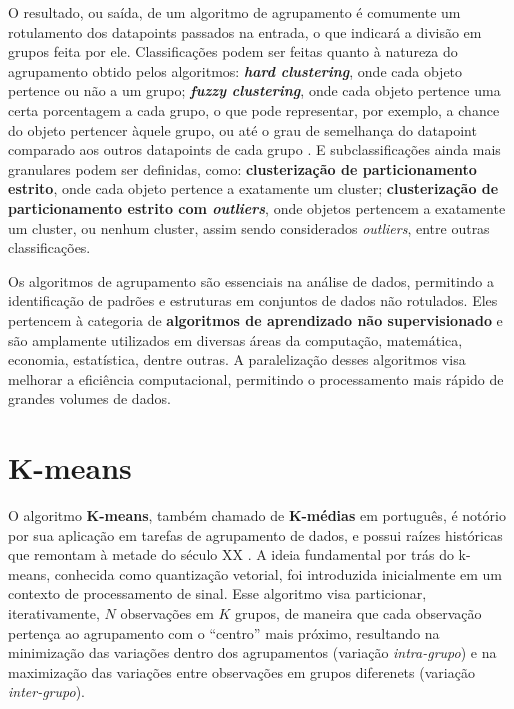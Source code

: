 \documentclass[12pt,
openright, 
oneside, %
a4paper,    %
brazil]{facom-ufu-abntex2}
\begin{document}
O resultado, ou saída, de um algoritmo de agrupamento é comumente um rotulamento dos datapoints passados na entrada, o que indicará a divisão em grupos feita por ele. Classificações podem ser feitas quanto à natureza do agrupamento obtido pelos algoritmos: \textbf{\textit{hard clustering}}, onde cada objeto pertence ou não a um grupo; \textbf{\textit{fuzzy clustering}}, onde cada objeto pertence uma certa porcentagem a cada grupo, o que pode representar, por exemplo, a chance do objeto pertencer àquele grupo, ou até o grau de semelhança do datapoint comparado aos outros datapoints de cada grupo \cite{FuzzyClusteringSurvey}. E subclassificações ainda mais granulares podem ser definidas, como: \textbf{clusterização de particionamento estrito}, onde cada objeto pertence a exatamente um cluster; \textbf{clusterização de particionamento estrito com \textit{outliers}}, onde objetos pertencem a exatamente um cluster, ou nenhum cluster, assim sendo considerados \textit{outliers}, entre outras classificações.

Os algoritmos de agrupamento são essenciais na análise de dados, permitindo a identificação de padrões e estruturas em conjuntos de dados não rotulados. Eles pertencem à categoria de \textbf{algoritmos de aprendizado não supervisionado} e são amplamente utilizados em diversas áreas da computação, matemática, economia, estatística, dentre outras. A paralelização desses algoritmos visa melhorar a eficiência computacional, permitindo o processamento mais rápido de grandes volumes de dados.




\section{K-means}
\label{sec:kMeans}

O algoritmo \textbf{K-means}, também chamado de \textbf{K-médias} em português, é notório por sua aplicação em tarefas de agrupamento de dados, e possui raízes históricas que remontam à metade do século XX \cite{kMeansHistoryBock2007}. A ideia fundamental por trás do k-means, conhecida como quantização vetorial, foi introduzida inicialmente em um contexto de processamento de sinal. Esse algoritmo visa particionar, iterativamente, $N$ observações em $K$ grupos, de maneira que cada observação pertença ao agrupamento com o \enquote{centro} mais próximo, resultando na minimização das variações dentro dos agrupamentos (variação \textit{intra-grupo}) e na maximização das variações entre observações em grupos diferenets (variação \textit{inter-grupo}).
\end{document}
